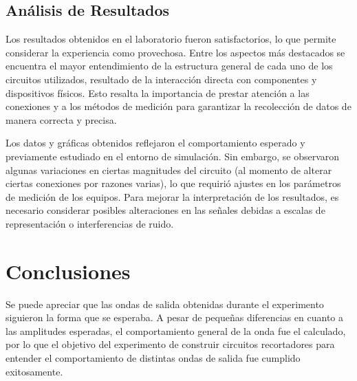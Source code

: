 \documentclass[journal]{IEEEtran}
\begin{document}
\subsection{Análisis de Resultados}
Los resultados obtenidos en el laboratorio fueron satisfactorios, lo que permite considerar la experiencia como provechosa. 
Entre los aspectos más destacados se encuentra el mayor entendimiento de la estructura general de cada uno de los circuitos utilizados, 
resultado de la interacción directa con componentes y dispositivos físicos. Esto resalta la importancia de prestar atención a las conexiones y a los 
métodos de medición para garantizar la recolección de datos de manera correcta y precisa.

Los datos y gráficas obtenidos reflejaron el comportamiento esperado y previamente estudiado en el entorno de simulación. 
Sin embargo, se observaron algunas variaciones en ciertas magnitudes del circuito (al momento de alterar ciertas conexiones por razones varias), 
lo que requirió ajustes en los parámetros de medición de los equipos. 
Para mejorar la interpretación de los resultados, es necesario considerar posibles alteraciones en las señales debidas a escalas de 
representación o interferencias de ruido.

\section{Conclusiones}
Se puede apreciar que las ondas de salida obtenidas durante el experimento siguieron la forma que se esperaba. A pesar de pequeñas diferencias
en cuanto a las amplitudes esperadas, el comportamiento general de la onda fue el calculado, por lo que el objetivo del experimento de construir circuitos recortadores
para entender el comportamiento de distintas ondas de salida fue cumplido exitosamente.

\appendices
\end{document}
